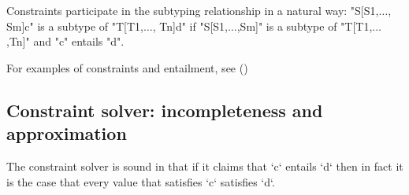 Constraints participate in the subtyping relationship in a natural way:
\xcdmath"S[S1,$\ldots$, Sm]{c}" 
is a subtype of 
\xcdmath"T[T1,$\ldots$, Tn]{d}" 
if \xcdmath"S[S1,$\ldots$,Sm]" is a subtype of \xcdmath"T[T1,$\ldots$,Tn]" and
\xcd"c" entails \xcd"d".

For examples of constraints and entailment, see ()


\subsection{Constraint solver: incompleteness and approximation}



The constraint solver is sound in that if it claims that \xcd`c` entails \xcd`d`
then in fact it is the case that every value that satisfies \xcd`c`
satisfies \xcd`d`. 

